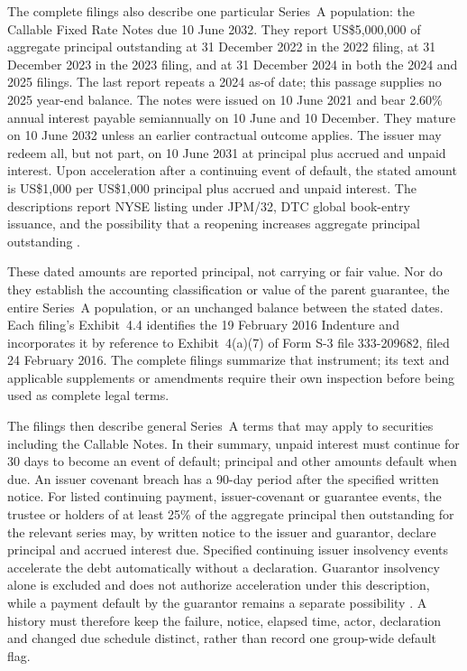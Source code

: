 The complete filings also describe one particular Series~A population: the
Callable Fixed Rate Notes due 10 June 2032. They report US\$5,000,000 of
aggregate principal outstanding at 31 December 2022 in the 2022 filing, at
31 December 2023 in the 2023 filing, and at 31 December 2024 in both the 2024
and 2025 filings. The last report repeats a 2024 as-of date; this passage
supplies no 2025 year-end balance. The notes were issued on 10 June 2021 and bear 2.60\%
annual interest payable semiannually on 10 June and 10 December. They mature
on 10 June 2032 unless an earlier contractual outcome applies. The issuer
may redeem all, but not part, on 10 June 2031 at principal plus accrued and
unpaid interest. Upon acceleration after a continuing event of default, the
stated amount is US\$1,000 per US\$1,000 principal plus accrued and unpaid
interest. The descriptions report NYSE listing under JPM/32, DTC global
book-entry issuance, and the possibility that a reopening increases aggregate
principal outstanding \citep{jpmorgan2022tenk,jpmorgan2023tenk,jpmorgan2024tenk,jpmorgan2025tenk}.

These dated amounts are reported principal, not carrying or fair value. Nor do
they establish the accounting classification or value of the parent guarantee,
the entire Series~A population, or an unchanged balance between the stated
dates. Each filing's Exhibit~4.4 identifies the 19 February 2016 Indenture
and incorporates it by reference to Exhibit~4(a)(7) of Form S-3 file
333-209682, filed 24 February 2016. The complete filings summarize that
instrument; its text and applicable supplements or amendments require their
own inspection before being used as complete legal terms.

\newpage
The filings then describe general Series~A terms that may apply to securities
including the Callable Notes. In their summary, unpaid interest must continue
for 30 days to become an event of default; principal and other amounts default
when due. An issuer covenant breach has a 90-day period after the specified
written notice. For listed continuing payment, issuer-covenant or guarantee
events, the trustee or holders of at least 25\% of the aggregate principal
then outstanding for the relevant series may, by written notice to the issuer
and guarantor, declare principal and accrued interest due. Specified continuing
issuer insolvency events accelerate the debt automatically without a declaration. Guarantor insolvency
alone is excluded and does not authorize acceleration under this description,
while a payment default by the guarantor remains a separate possibility
\citep{jpmorgan2022tenk,jpmorgan2023tenk,jpmorgan2024tenk,jpmorgan2025tenk}.
A history must therefore keep the failure, notice, elapsed time, actor,
declaration and changed due schedule distinct, rather than record one
group-wide default flag.

